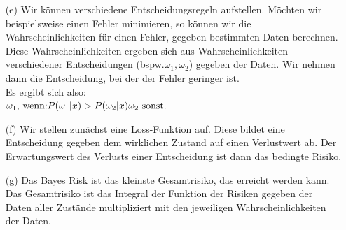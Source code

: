\documentclass[a4paper]{scrartcl}
\begin{document}
\begin{itemize}
\item[(e)] Wir können verschiedene Entscheidungsregeln aufstellen. Möchten wir beispielsweise einen Fehler minimieren, so können wir die Wahrscheinlichkeiten für einen Fehler, gegeben bestimmten Daten berechnen.\\
Diese Wahrscheinlichkeiten ergeben sich aus Wahrscheinlichkeiten verschiedener Entscheidungen (bspw.$\omega_1, \omega_2$) gegeben der Daten. Wir nehmen dann die Entscheidung, bei der der Fehler geringer ist.\\
Es ergibt sich also:\\
$
\omega_1 \text{, wenn:} P(\omega_1|x) > P(\omega_2|x)\\
\omega_2 \text{ sonst.}
$\\

\item[(f)] Wir stellen zunächst eine Loss-Funktion auf. Diese bildet eine Entscheidung gegeben dem wirklichen Zustand auf einen Verlustwert ab. Der Erwartungswert des Verlusts einer Entscheidung ist dann das bedingte Risiko.



\item[(g)] Das Bayes Risk ist das kleinste Gesamtrisiko, das erreicht werden kann. Das Gesamtrisiko ist das Integral der Funktion der Risiken gegeben der Daten aller Zustände multipliziert mit den jeweiligen Wahrscheinlichkeiten der Daten.




\end{itemize}
\end{document}
